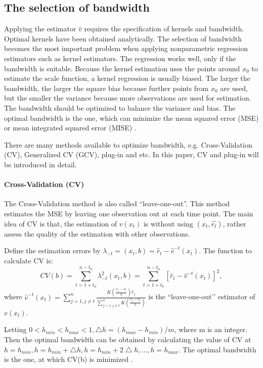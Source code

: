 \subsection{The selection of bandwidth}
Applying the estimator $\hat{v}$  requires the specification of kernels and bandwidth. Optimal kernels have been obtained analytically. The selection of bandwidth becomes the most important problem when applying nonparametric regression estimators such as kernel estimators. The regression works well, only if the bandwidth is suitable. Because the kernel estimation uses the points around $x_{0}$  to estimate the scale function, a kernel regression is usually biased. The larger the bandwidth, the larger the square bias because further points from $x_{0}$ are used, but the smaller the variance because more observations are used for estimation. The bandwidth should be optimized to balance the variance and bias. The optimal bandwidth is the one, which can minimize the mean squared error (MSE) or mean integrated squared error (MISE) \citep{Gasser1991}. 

There are many methods available to optimize bandwidth, e.g. Cross-Validation (CV), Generalized CV (GCV), plug-in and etc. In this paper, CV and plug-in will be introduced in detail.

\paragraph{Cross-Validation (CV)}

The Cross-Validation method is also called “leave-one-out”.  This method estimates the MSE by leaving one observation out at each time point. The main idea of CV is that, the estimation of $v(x_{t})$ is without using $(x_{t},\hat{r_{t}})$, rather assess the quality of the estimation with other observations. 

Define the estimation errors by $\lambda_{-t}=(x_{t},b)=\hat{r}_{t}-\hat{v}^{-t}(x_{t})$. The function to calculate CV is:
\begin{equation}
CV(b) = \sum_{t=1+t_{0}}^{n-t_{0}}\lambda_{-t}^{2}(x_{t},b)=\sum_{t=1+t_{0}}^{n-t_{0}}[\hat{r}_{t}-\hat{v}^{-t}(x_{t})]^{2},
\end{equation}
where $\hat{v}^{-t}(x_t)=\sum_{j=1,j\neq t}^{n}\frac{K(\frac{x_{j}-x_{t}}{b})\hat{r}_{j}}{\sum_{j=1,j \neq t}^{n}K(\frac{x_{j}-x_{t}}{b})}$ is the “leave-one-out’’ estimator of $v(x_{t})$.

Letting $0<h_{min}<h_{max}<1, \bigtriangleup h=(h_{max}-h_{min})/m$, where m is an integer. Then the optimal bandwidth can be obtained by calculating the value of CV at $h=h_{min}, h=h_{min} + \bigtriangleup h, h=h_{min} + 2\bigtriangleup h, \ldots, h=h_{max}$. The optimal bandwidth is the one, at which CV(b) is minimized \citep{Sarda1993}.

